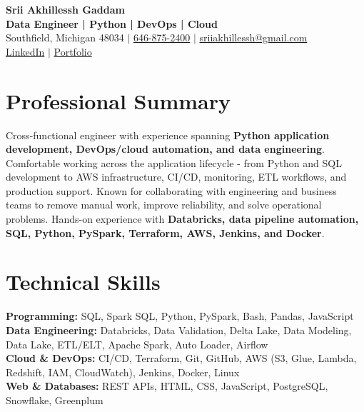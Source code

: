 \documentclass[letterpaper,10pt]{article}
\begin{document}
\fontsize{9.35pt}{10.45pt}\selectfont

\begin{center}
    {\LARGE \textbf{Srii Akhillessh Gaddam}} \\[-1pt]
    \textbf{Data Engineer | Python | DevOps | Cloud} \\[2pt]
    Southfield, Michigan 48034 $|$
    \href{tel:6468752400}{646-875-2400} $|$
    \href{mailto:sriiakhillessh@gmail.com}{sriiakhillessh@gmail.com} \\[1pt]
    \href{https://www.linkedin.com/in/srii-akhiilessh-gaddam-b48668191/}{LinkedIn} $|$
    \href{https://sriiakhillesshg.github.io/portfolio/}{Portfolio}
\end{center}
\vspace{-8pt}

\section{Professional Summary}
\small{Cross-functional engineer with experience spanning \textbf{Python application development, DevOps/cloud automation, and data engineering}. Comfortable working across the application lifecycle - from Python and SQL development to AWS infrastructure, CI/CD, monitoring, ETL workflows, and production support. Known for collaborating with engineering and business teams to remove manual work, improve reliability, and solve operational problems. Hands-on experience with \textbf{Databricks, data pipeline automation, SQL, Python, PySpark, Terraform, AWS, Jenkins, and Docker}.}

\section{Technical Skills}
\small{
\textbf{Programming:} SQL, Spark SQL, Python, PySpark, Bash, Pandas, JavaScript \\
\textbf{Data Engineering:} Databricks, Data Validation, Delta Lake, Data Modeling, Data Lake, ETL/ELT, Apache Spark, Auto Loader, Airflow \\
\textbf{Cloud \& DevOps:} CI/CD, Terraform, Git, GitHub, AWS (S3, Glue, Lambda, Redshift, IAM, CloudWatch), Jenkins, Docker, Linux \\
\textbf{Web \& Databases:} REST APIs, HTML, CSS, JavaScript, PostgreSQL, Snowflake, Greenplum
}
\end{document}
